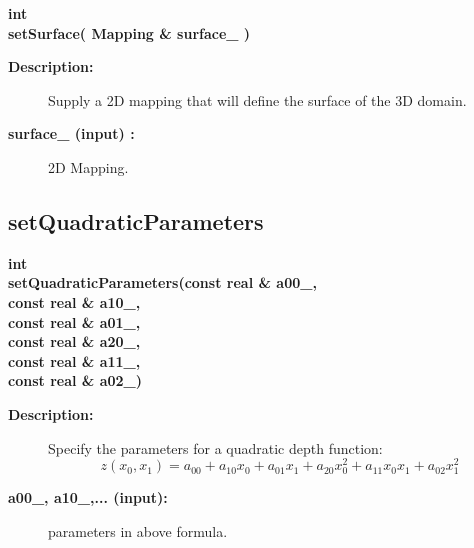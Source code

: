 \begin{flushleft} \textbf{%
int  \\ 
\settowidth{\DepthMappingIncludeArgIndent}{setSurface(}%
setSurface( Mapping \& surface\_ )
}\end{flushleft}
\begin{description}
\item[{\bf Description:}] 
    Supply a 2D mapping that will define the surface of the 3D domain.
\item[{\bf surface\_ (input) :}]  2D Mapping.
\end{description}
\subsection{setQuadraticParameters}
 
\begin{flushleft} \textbf{%
int  \\ 
\settowidth{\DepthMappingIncludeArgIndent}{setQuadraticParameters(}%
setQuadraticParameters(const real \& a00\_,\\ 
\hspace{\DepthMappingIncludeArgIndent}const real \& a10\_, \\ 
\hspace{\DepthMappingIncludeArgIndent}const real \& a01\_, \\ 
\hspace{\DepthMappingIncludeArgIndent}const real \& a20\_, \\ 
\hspace{\DepthMappingIncludeArgIndent}const real \& a11\_, \\ 
\hspace{\DepthMappingIncludeArgIndent}const real \& a02\_)
}\end{flushleft}
\begin{description}
\item[{\bf Description:}] 
    Specify the parameters for a quadratic depth function:
 \[
    z(x_0,x_1) =  a_{00} + a_{10} x_0 + a_{01} x_1 + a_{20} x_0^2 + a_{11}x_0 x_1 + a_{02} x_1^2
 \]
 
\item[{\bf a00\_, a10\_,... (input):}]  parameters in above formula.
\end{description}
